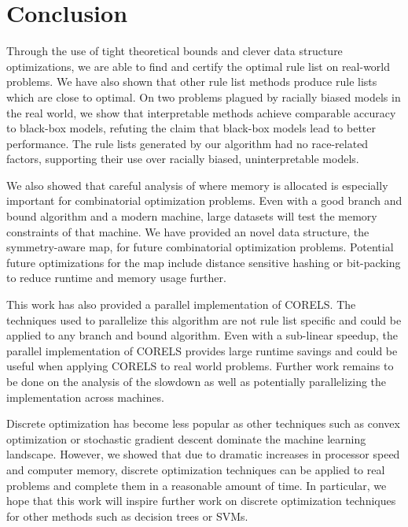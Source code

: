 \chapter{Conclusion}
\label{conclusion}
Through the use of tight theoretical bounds and clever data structure optimizations, we are able to find and certify the optimal rule list on real-world problems.
We have also shown that other rule list methods produce rule lists which are close to optimal.
On two problems plagued by racially biased models in the real world, we show that interpretable methods achieve comparable accuracy to black-box models, refuting the claim that black-box models lead to better performance.
The rule lists generated by our algorithm had no race-related factors, supporting their use over racially biased, uninterpretable models.

We also showed that careful analysis of where memory is allocated is especially important for combinatorial optimization problems.
Even with a good branch and bound algorithm and a modern machine, large datasets will test the memory constraints of that machine.
We have provided an novel data structure, the symmetry-aware map, for future combinatorial optimization problems.
Potential future optimizations for the map include distance sensitive hashing or bit-packing to reduce runtime and memory usage further.

This work has also provided a parallel implementation of CORELS.
The techniques used to parallelize this algorithm are not rule list specific and could be applied to any branch and bound algorithm.
Even with a sub-linear speedup, the parallel implementation of CORELS provides large runtime savings and could be useful when applying CORELS to real world problems.
Further work remains to be done on the analysis of the slowdown as well as potentially parallelizing the implementation across machines.


Discrete optimization has become less popular as other techniques such as convex optimization or stochastic gradient descent dominate the machine learning landscape.
However, we showed that due to dramatic increases in processor speed and computer memory, discrete optimization techniques can be applied to real problems and complete them in a reasonable amount of time.
In particular, we hope that this work will inspire further work on discrete optimization techniques for other methods such as decision trees or SVMs.